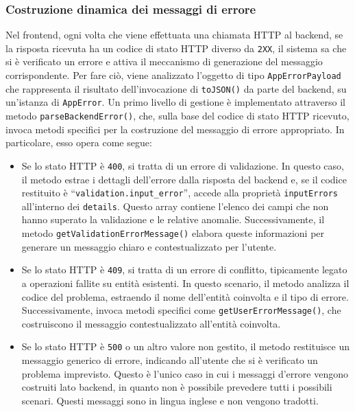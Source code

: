 \subsubsection{Costruzione dinamica dei messaggi di errore}
Nel frontend, ogni volta che viene effettuata una chiamata HTTP al backend, se la risposta ricevuta ha un codice di stato HTTP diverso da \texttt{2XX}, il sistema sa che si è verificato un errore e attiva il meccanismo di generazione del messaggio corrispondente. Per fare ciò, viene analizzato l’oggetto di tipo \texttt{AppErrorPayload} che rappresenta il risultato dell'invocazione di \texttt{toJSON()} da parte del backend, su un'istanza di \texttt{AppError}.
%
Un primo livello di gestione è implementato attraverso il metodo \texttt{parseBackendError()}, che, sulla base del codice di stato HTTP ricevuto, invoca metodi specifici per la costruzione del messaggio di errore appropriato. In particolare, esso opera come segue:
\begin{itemize}
  \item Se lo stato HTTP è \texttt{400}, si tratta di un errore di validazione. In questo caso, il metodo estrae i dettagli dell'errore dalla risposta del backend e, se il codice restituito è ``\texttt{validation.input\_error}'', accede alla proprietà \texttt{inputErrors} all'interno dei \texttt{details}. Questo array contiene l’elenco dei campi che non hanno superato la validazione e le relative anomalie. Successivamente, il metodo \texttt{getValidationErrorMessage()} elabora queste informazioni per generare un messaggio chiaro e contestualizzato per l’utente.
  \item Se lo stato HTTP è \texttt{409}, si tratta di un errore di conflitto, tipicamente legato a operazioni fallite su entità esistenti. In questo scenario, il metodo analizza il codice del problema, estraendo il nome dell’entità coinvolta e il tipo di errore. Successivamente, invoca metodi specifici come \texttt{getUserErrorMessage()}, che costruiscono il messaggio contestualizzato all'entità coinvolta.
  \item Se lo stato HTTP è \texttt{500} o un altro valore non gestito, il metodo restituisce un messaggio generico di errore, indicando all’utente che si è verificato un problema imprevisto. Questo è l'unico caso in cui i messaggi d'errore vengono costruiti lato backend, in quanto non è possibile prevedere tutti i possibili scenari. Questi messaggi sono in lingua inglese e non vengono tradotti.
\end{itemize}

% 

